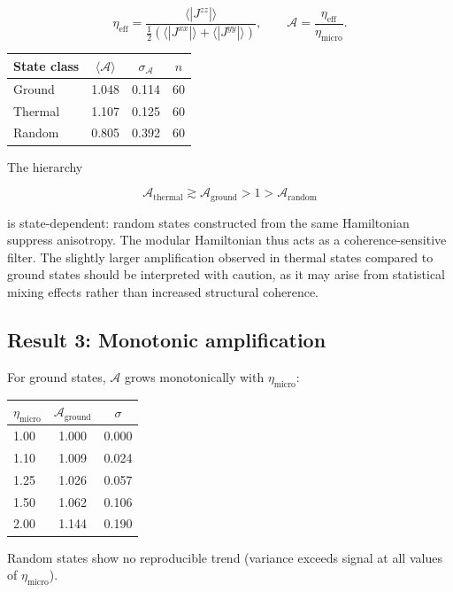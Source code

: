 \documentclass[11pt]{article}
\begin{document}
\[
\eta_{\mathrm{eff}} = \frac{\langle |J^{zz}|\rangle}
{\tfrac{1}{2}(\langle |J^{xx}|\rangle + \langle |J^{yy}|\rangle)},
\qquad
\mathcal{A} = \frac{\eta_{\mathrm{eff}}}{\eta_{\mathrm{micro}}}.
\]

\begin{center}
\begin{tabular}{lccc}
\toprule
State class & $\langle\mathcal{A}\rangle$ & $\sigma_{\mathcal{A}}$ & $n$ \\
\midrule
Ground  & 1.048 & 0.114 & 60 \\
Thermal & 1.107 & 0.125 & 60 \\
Random  & 0.805 & 0.392 & 60 \\
\bottomrule
\end{tabular}
\end{center}

The hierarchy

\[
\mathcal{A}_{\mathrm{thermal}} \gtrsim \mathcal{A}_{\mathrm{ground}} > 1 > \mathcal{A}_{\mathrm{random}}
\]

is state-dependent: random states constructed from the same Hamiltonian
suppress anisotropy. The modular Hamiltonian thus acts as a
coherence-sensitive filter. The slightly larger amplification observed
in thermal states compared to ground states should be interpreted
with caution, as it may arise from statistical mixing effects rather
than increased structural coherence.

\subsection{Result 3: Monotonic amplification}

For ground states, $\mathcal{A}$ grows monotonically with
$\eta_{\mathrm{micro}}$:

\begin{center}
\begin{tabular}{lcc}
\toprule
$\eta_{\mathrm{micro}}$ & $\mathcal{A}_{\mathrm{ground}}$ & $\sigma$ \\
\midrule
1.00 & 1.000 & 0.000 \\
1.10 & 1.009 & 0.024 \\
1.25 & 1.026 & 0.057 \\
1.50 & 1.062 & 0.106 \\
2.00 & 1.144 & 0.190 \\
\bottomrule
\end{tabular}
\end{center}

Random states show no reproducible trend (variance exceeds signal at
all values of $\eta_{\mathrm{micro}}$).
\end{document}
